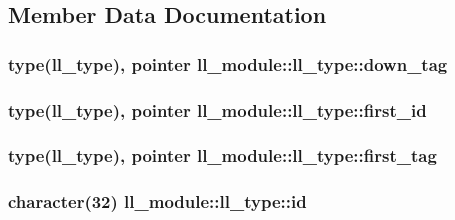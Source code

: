 \subsection{Member Data Documentation}
\hypertarget{structll__module_1_1ll__type_a109f4a1fc222502095c755cce2742a35}{}
\subsubsection[{down\+\_\+tag}]{\setlength{\rightskip}{0pt plus 5cm}type({\bf ll\+\_\+type}), pointer ll\+\_\+module\+::ll\+\_\+type\+::down\+\_\+tag}\label{structll__module_1_1ll__type_a109f4a1fc222502095c755cce2742a35}
\hypertarget{structll__module_1_1ll__type_a5f4aff1485cdccd51cacbe1faac6ef21}{}
\subsubsection[{first\+\_\+id}]{\setlength{\rightskip}{0pt plus 5cm}type({\bf ll\+\_\+type}), pointer ll\+\_\+module\+::ll\+\_\+type\+::first\+\_\+id}\label{structll__module_1_1ll__type_a5f4aff1485cdccd51cacbe1faac6ef21}
\hypertarget{structll__module_1_1ll__type_ae9e4c15f89cc0b4c9d6cea9acf5fb0c8}{}
\subsubsection[{first\+\_\+tag}]{\setlength{\rightskip}{0pt plus 5cm}type({\bf ll\+\_\+type}), pointer ll\+\_\+module\+::ll\+\_\+type\+::first\+\_\+tag}\label{structll__module_1_1ll__type_ae9e4c15f89cc0b4c9d6cea9acf5fb0c8}
\hypertarget{structll__module_1_1ll__type_aba121ee1152cbef3575b7ec86a79f8c0}{}
\subsubsection[{id}]{\setlength{\rightskip}{0pt plus 5cm}character(32) ll\+\_\+module\+::ll\+\_\+type\+::id}\label{structll__module_1_1ll__type_aba121ee1152cbef3575b7ec86a79f8c0}
\hypertarget{structll__module_1_1ll__type_a00a13f2be3d837b02d9d3d077ba8cbe5}{}
